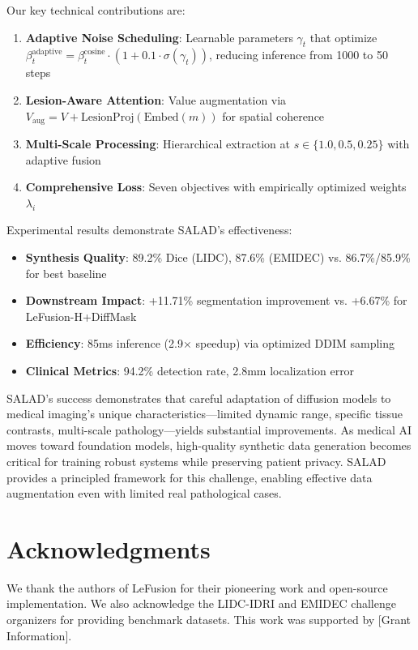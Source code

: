 \documentclass[10pt,twocolumn,letterpaper]{article}
\begin{document}
Our key technical contributions are:
\begin{enumerate}
    \item \textbf{Adaptive Noise Scheduling}: Learnable parameters $\gamma_t$ that optimize $\beta_t^{\text{adaptive}} = \beta_t^{\text{cosine}} \cdot (1 + 0.1 \cdot \sigma(\gamma_t))$, reducing inference from 1000 to 50 steps
    \item \textbf{Lesion-Aware Attention}: Value augmentation via $V_{\text{aug}} = V + \text{LesionProj}(\text{Embed}(m))$ for spatial coherence
    \item \textbf{Multi-Scale Processing}: Hierarchical extraction at $s \in \{1.0, 0.5, 0.25\}$ with adaptive fusion
    \item \textbf{Comprehensive Loss}: Seven objectives with empirically optimized weights $\lambda_i$
\end{enumerate}

Experimental results demonstrate SALAD's effectiveness:
\begin{itemize}
    \item \textbf{Synthesis Quality}: 89.2\% Dice (LIDC), 87.6\% (EMIDEC) vs. 86.7\%/85.9\% for best baseline
    \item \textbf{Downstream Impact}: +11.71\% segmentation improvement vs. +6.67\% for LeFusion-H+DiffMask
    \item \textbf{Efficiency}: 85ms inference (2.9× speedup) via optimized DDIM sampling
    \item \textbf{Clinical Metrics}: 94.2\% detection rate, 2.8mm localization error
\end{itemize}

SALAD's success demonstrates that careful adaptation of diffusion models to medical imaging's unique characteristics—limited dynamic range, specific tissue contrasts, multi-scale pathology—yields substantial improvements. As medical AI moves toward foundation models, high-quality synthetic data generation becomes critical for training robust systems while preserving patient privacy. SALAD provides a principled framework for this challenge, enabling effective data augmentation even with limited real pathological cases.

\section*{Acknowledgments}

We thank the authors of LeFusion for their pioneering work and open-source implementation. We also acknowledge the LIDC-IDRI and EMIDEC challenge organizers for providing benchmark datasets. This work was supported by [Grant Information].
\end{document}
